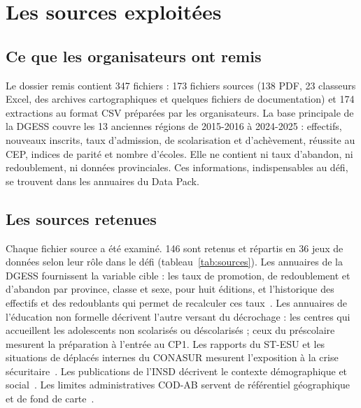 \documentclass{article}
\begin{document}
\section{Les sources exploitées}

\subsection{Ce que les organisateurs ont remis}

Le dossier remis contient 347 fichiers : 173 fichiers sources (138 PDF, 23 classeurs Excel, des archives cartographiques et quelques fichiers de documentation) et 174 extractions au format CSV préparées par les organisateurs. La base principale de la DGESS couvre les 13 anciennes régions de 2015-2016 à 2024-2025 : effectifs, nouveaux inscrits, taux d'admission, de scolarisation et d'achèvement, réussite au CEP, indices de parité et nombre d'écoles. Elle ne contient ni taux d'abandon, ni redoublement, ni données provinciales. Ces informations, indispensables au défi, se trouvent dans les annuaires du Data Pack.

\subsection{Les sources retenues}

Chaque fichier source a été examiné. 146 sont retenus et répartis en 36 jeux de données selon leur rôle dans le défi (tableau~\ref{tab:sources}). Les annuaires de la DGESS fournissent la variable cible : les taux de promotion, de redoublement et d'abandon par province, classe et sexe, pour huit éditions, et l'historique des effectifs et des redoublants qui permet de recalculer ces taux~\cite{dgess_annuaires}. Les annuaires de l'éducation non formelle décrivent l'autre versant du décrochage : les centres qui accueillent les adolescents non scolarisés ou déscolarisés ; ceux du préscolaire mesurent la préparation à l'entrée au CP1. Les rapports du ST-ESU et les situations de déplacés internes du CONASUR mesurent l'exposition à la crise sécuritaire~\cite{stesu,conasur}. Les publications de l'INSD décrivent le contexte démographique et social~\cite{insd_rgph,insd_annuaires,insd_pauvrete,ehcvm2021,eds2021}. Les limites administratives COD-AB servent de référentiel géographique et de fond de carte~\cite{codab}.
\end{document}
